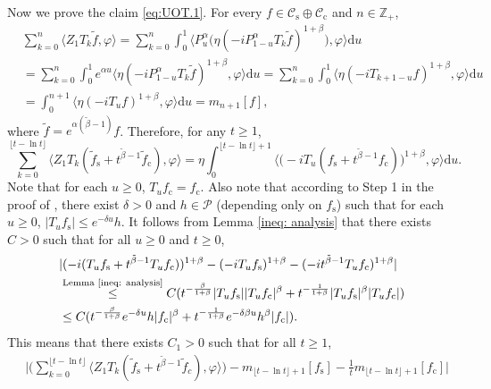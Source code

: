 \documentclass{amse-new}
\numberwithin{equation}{section}
\begin{document}
\begin{prof}
	Now we prove the claim \eqref{eq:UOT.1}.
	For every $f\in \mathcal C_\mathrm s  \oplus \mathcal C_\mathrm c$ and $n\in \mathbb Z_+$,
 \begin{align}
  	& \sum_{k=0}^n \langle Z_1 T_{k} \tilde f, \varphi \rangle
  	= \sum_{k=0}^n \int_0^1 \big\langle P_u^\alpha \big(\eta(-iP_{1 - u}^\alpha T_k \tilde f)^{1+\beta}\big), \varphi\big\rangle \mathrm du
 	\\& = \sum_{k=0}^n \int_0^1 e^{\alpha u} \langle \eta (-iP_{1 - u}^\alpha T_{k}\tilde f)^{1+\beta}, \varphi \rangle \mathrm du
 	= \sum_{k=0}^n \int_0^1 \langle \eta (-iT_{k+1 - u} f)^{1+\beta}, \varphi\rangle \mathrm du
 	\\&= \int_0^{n+1} \langle  \eta (-iT_{u} f)^{1+\beta}, \varphi\rangle \mathrm du
 	= m_{n+1}[f],
\end{align}
	where $\tilde f=e^{\alpha(\tilde \beta - 1)} f$.
	Therefore, for any $t\geq 1$,
\begin{equation} \label{eq:UOT.15}
	\sum_{k=0}^{\lfloor t-\ln t \rfloor} \langle Z_1T_{k}(\tilde f_\mathrm s+t^{\tilde{\beta}-1}\tilde{f}_\mathrm c), \varphi\rangle
	= \eta \int_0^{\lfloor t-\ln t \rfloor+1}\big\langle \big(-iT_u(f_\mathrm s+t^{\tilde{\beta}-1}f_\mathrm c)\big)^{1+\beta},\varphi \big\rangle \mathrm du.
\end{equation}
	Note that for each $u\geq 0$, $T_uf_\mathrm c=f_\mathrm c$.
	Also note that according to
 	Step 1 in the proof of \cite[Lemma 2.6]{RenSongSunZhao2019Stable}, there exist $\delta> 0$ and $h\in \mathcal P$ (depending only on $f_\mathrm s$) such that for each $u\geq 0$, $|T_u f_\mathrm s|\leq e^{-\delta u}h$.
	It follows from Lemma \ref{ineq: analysis} that there exists $C>0$ such that for all $u\geq 0$ and $t\geq 0$,
\begin{align}
  	&|(-i(T_uf_\mathrm s+t^{\tilde{\beta}-1}T_uf_\mathrm c))^{1+\beta}-(-iT_uf_\mathrm s)^{1+\beta}-(-it^{\tilde{\beta}-1}T_uf_\mathrm c)^{1+\beta}|
  	\\&\overset{\text{Lemma \ref{ineq: analysis}}}
  	\leq  C(t^{-\frac{\beta}{1+\beta}}|T_uf_\mathrm s||T_uf_\mathrm c|^{\beta}+t^{-\frac{1}{1+\beta}}|T_uf_\mathrm s|^{\beta}|T_uf_\mathrm c|)
  	\\&\label{eq:UOT.21}\leq C(t^{-\frac{\beta}{1+\beta}}e^{-\delta u}h|f_\mathrm c|^{\beta}+t^{-\frac{1}{1+\beta}}e^{-\delta\beta u}h^{\beta}|f_\mathrm c|).
\end{align}
	This means that there exists $C_1 >0$ such that for all $t\geq 1$,
\begin{align}
	&\Big|\Big(\sum_{k=0}^{\lfloor t-\ln t \rfloor} \langle Z_1T_{k}(\tilde f_\mathrm s+t^{\tilde{\beta}-1}\tilde{f}_c), \varphi\rangle \Big)-m_{\lfloor t-\ln t \rfloor+1}[f_\mathrm s]-\frac{1}{t}m_{\lfloor t-\ln t \rfloor+1}[f_\mathrm c]\Big|

\end{align}
\end{prof}
\end{document}
